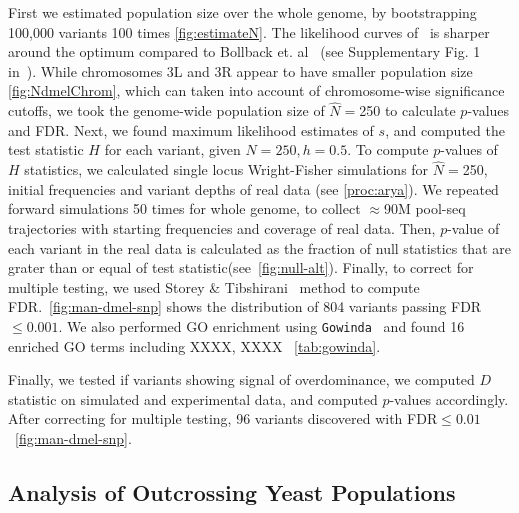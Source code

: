 First we estimated population size over the whole genome, by bootstrapping 
100,000  variants 100 times \ref{fig:estimateN}. 
The likelihood curves of \comale\ is sharper around the optimum compared to 
Bollback et. al~\cite{bollback2008estimation} (see Supplementary Fig. 1 
in~\cite{orozco2012adaptation}).
While chromosomes 3L and 3R 
appear to have smaller population size \ref{fig:NdmelChrom}, which can taken 
into account of 
chromosome-wise significance cutoffs, we took the genome-wide population size 
of $\widehat{N}=$250 to calculate $p$-values and FDR.
Next, we found maximum likelihood estimates of $s$, and computed the test 
statistic $H$ for each variant, given $N=250, h=0.5$. To compute $p$-values of 
$H$ statistics, we calculated 
single locus Wright-Fisher simulations for $\widehat{N}=$250, initial 
frequencies and variant depths of real data (see \ref{proc:arya}). We repeated 
forward simulations 50 times for whole genome, to collect $\approx$90M pool-seq 
trajectories 
with starting frequencies and coverage of real data. Then, $p$-value of each 
variant in the real 
data is calculated as the fraction of null statistics that are grater than or 
equal of test statistic(see~\ref{fig:null-alt}). Finally, to correct for 
multiple 
testing, we used 
Storey \& Tibshirani~\cite{storey2003statistical} method to compute 
FDR.~\ref{fig:man-dmel-snp} shows the distribution of 804 variants 
passing FDR$\le 
0.001$. We also performed GO
enrichment using \texttt{Gowinda}~\cite{kofler2012gowinda} and found 16 
enriched GO terms including XXXX, XXXX ~\ref{tab:gowinda}.

Finally, we tested if variants showing signal of overdominance, we computed $D$ 
statistic on simulated and experimental data, and computed $p$-values 
accordingly. After correcting for multiple testing, 96 variants discovered with 
FDR$\le 0.01$~\ref{fig:man-dmel-snp}. 
\subsection{Analysis of Outcrossing Yeast Populations}

